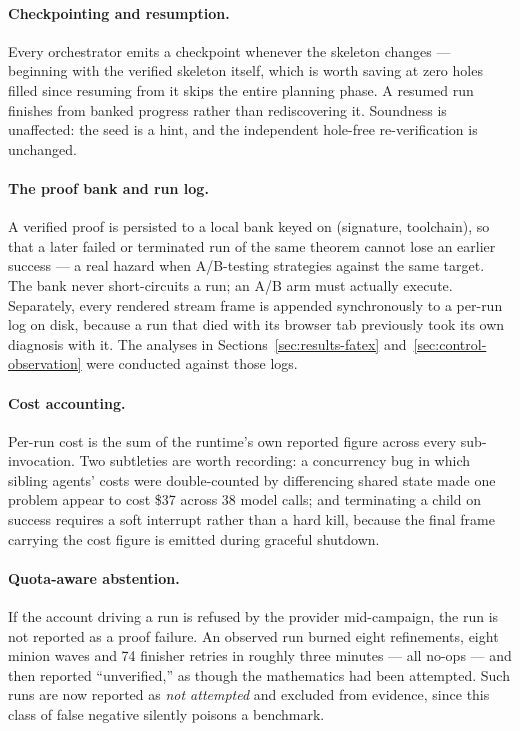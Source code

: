 \documentclass[12pt, a4paper]{article}
\begin{document}
\paragraph{Checkpointing and resumption.} Every orchestrator emits a
checkpoint whenever the skeleton changes --- beginning with the verified
skeleton itself, which is worth saving at zero holes filled since resuming
from it skips the entire planning phase. A resumed run finishes from banked
progress rather than rediscovering it. Soundness is unaffected: the seed is
a hint, and the independent hole-free re-verification is unchanged.

\paragraph{The proof bank and run log.} A verified proof is persisted to a
local bank keyed on (signature, toolchain), so that a later failed or
terminated run of the same theorem cannot lose an earlier success --- a real
hazard when A/B-testing strategies against the same target. The bank never
short-circuits a run; an A/B arm must actually execute. Separately, every
rendered stream frame is appended synchronously to a per-run log on disk,
because a run that died with its browser tab previously took its own
diagnosis with it. The analyses in Sections~\ref{sec:results-fatex}
and~\ref{sec:control-observation} were conducted against those logs.

\paragraph{Cost accounting.} Per-run cost is the sum of the runtime's own
reported figure across every sub-invocation. Two subtleties are worth
recording: a concurrency bug in which sibling agents' costs were
double-counted by differencing shared state made one problem appear to cost
\$37 across 38 model calls; and terminating a child on success requires a
soft interrupt rather than a hard kill, because the final frame carrying the
cost figure is emitted during graceful shutdown.

\paragraph{Quota-aware abstention.} If the account driving a run is refused
by the provider mid-campaign, the run is not reported as a proof failure. An
observed run burned eight refinements, eight minion waves and 74 finisher
retries in roughly three minutes --- all no-ops --- and then reported
``unverified,'' as though the mathematics had been attempted. Such runs are
now reported as \emph{not attempted} and excluded from evidence, since this
class of false negative silently poisons a benchmark.
\end{document}
